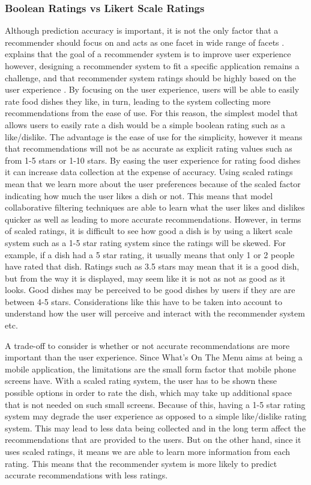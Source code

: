 \subsubsection{Boolean Ratings vs Likert Scale Ratings}

Although prediction accuracy is important, it is not the only factor that a recommender should focus on and acts as one facet in wide range of facets \cite{martin2009recsys}. \citeauthor{martin2009recsys} explains that the goal of a recommender system is to improve user experience however, designing a recommender system to fit a specific application remains a challenge, and that recommender system ratings should be highly based on the user experience \cite{martin2009recsys}. By focusing on the user experience, users will be able to easily rate food dishes they like, in turn, leading to the system collecting more recommendations from the ease of use. For this reason, the simplest model that allows users to easily rate a dish would be a simple boolean rating such as a like/dislike. The advantage is the ease of use for the simplicity, however it means that recommendations will not be as accurate as explicit rating values such as from 1-5 stars or 1-10 stars. By easing the user experience for rating food dishes it can increase data collection at the expense of accuracy. Using scaled ratings mean that we learn more about the user preferences because of the scaled factor indicating how much the user likes a dish or not. This means that model collaborative filtering techniques are able to learn what the user likes and dislikes quicker as well as leading to more accurate recommendations. However, in terms of scaled ratings, it is difficult to see how good a dish is by using a likert scale system such as a 1-5 star rating system since the ratings will be skewed. For example, if a dish had a 5 star rating, it usually means that only 1 or 2 people have rated that dish. Ratings such as 3.5 stars may mean that it is a good dish, but from the way it is displayed, may seem like it is not as not as good as it looks. Good dishes may be perceived to be good dishes by users if they are are between 4-5 stars. Considerations like this have to be taken into account to understand how the user will perceive and interact with the recommender system etc.  

A trade-off to consider is whether or not accurate recommendations are more important than the user experience. Since What's On The Menu aims at being a mobile application, the limitations are the small form factor that mobile phone screens have. With a scaled rating system, the user has to be shown these possible options in order to rate the dish, which may take up additional space that is not needed on such small screens. Because of this, having a 1-5 star rating system may degrade the user experience as opposed to a simple like/dislike rating system. This may lead to less data being collected and in the long term affect the recommendations that are provided to the users. But on the other hand, since it uses scaled ratings, it means we are able to learn more information from each rating. This means that the recommender system is more likely to predict accurate recommendations with less ratings. 

